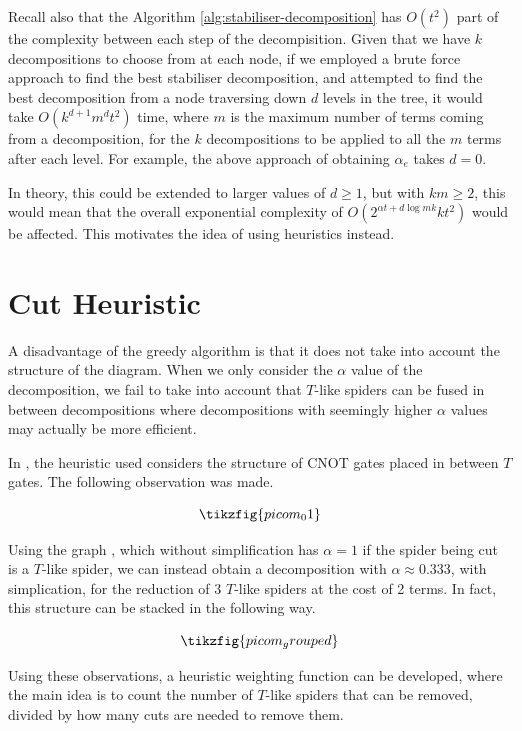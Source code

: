 Recall also that the Algorithm \ref{alg:stabiliser-decomposition} has $O(t^2)$ part of the complexity
between each step of the decompisition.
Given that we have $k$ decompositions to choose from at each node,
if we employed a brute force approach to find the best stabiliser decomposition,
and attempted to find the best decomposition from a node traversing down $d$ levels in the tree,
it would take $O(k^{d+1} m^d t^2)$ time, where $m$ is the maximum number of terms coming from a decomposition,
for the $k$ decompositions to be applied to all the $m$ terms after each level.
For example, the above approach of obtaining $\alpha_e$ takes $d=0$.

In theory, this could be extended to larger values of $d\geq 1$, but with $km\geq 2$,
this would mean that the overall exponential complexity of $O(2^{\alpha t + d\log mk}kt^2)$ would be affected.
This motivates the idea of using heuristics instead.

\section{Cut Heuristic}
\label{sec:cut-heuristic}

A disadvantage of the greedy algorithm is that it does not take into account the structure of the diagram.
When we only consider the $\alpha$ value of the decomposition, 
we fail to take into account that $T$-like spiders can be fused in between decompositions
where decompositions with seemingly higher $\alpha$ values may actually be more efficient.

In \cite{sutcliffe2024proccut}, the heuristic used considers the structure of CNOT gates
placed in between $T$ gates.
The following observation was made.

\begin{equation}
    \tikzfig{picom_01}
\end{equation}

Using the graph \CutRule, 
which without simplification has $\alpha = 1$ if the spider being cut is a $T$-like spider,
we can instead obtain a decomposition with $\alpha \approx 0.333$, with simplication,
for the reduction of 3 $T$-like spiders at the cost of 2 terms.
In fact, this structure can be stacked in the following way.

\begin{equation}
    \tikzfig{picom_grouped}
\end{equation}

Using these observations, a heuristic weighting function can be developed,
where the main idea is to count the number of $T$-like spiders that can be removed,
divided by how many cuts are needed to remove them.

